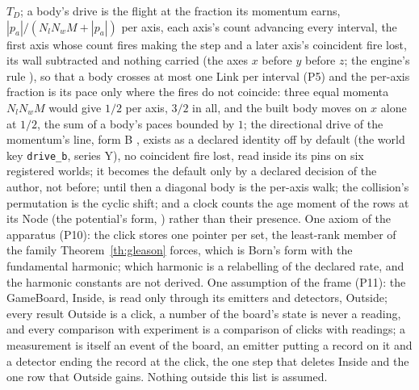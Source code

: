 $T_D$; a body's drive is the flight at the fraction its momentum earns, $|p_a|/(N_l N_w M + |p_a|)$ per axis, each axis's count advancing every interval, the first axis whose count fires making the step and a later axis's coincident fire lost, its wall subtracted and nothing carried (the axes $x$ before $y$ before $z$; the engine's rule \cite{engine}), so that a body crosses at most one Link per interval (P5) and the per-axis fraction is its pace only where the fires do not coincide: three equal momenta $N_l N_w M$ would give $1/2$ per axis, $3/2$ in all, and the built body moves on $x$ alone at $1/2$, the sum of a body's paces bounded by $1$; the directional drive of the momentum's line, form B \cite[record 652]{log}, exists as a declared identity off by default (the world key \texttt{drive\_b}, series Y), no coincident fire lost, read inside its pins on six registered worlds; it becomes the default only by a declared decision of the author, not before; until then a diagonal body is the per-axis walk; the collision's permutation is the cyclic shift; and a clock counts the age moment of the rows at its
Node (the potential's form, \cite[record 394]{log})
rather than their presence. One axiom of the apparatus (P10): the click
stores one pointer per set, the least-rank member of the family
Theorem~\ref{th:gleason} forces, which is Born's form with the
fundamental harmonic; which harmonic is a relabelling of the declared
rate, and the harmonic constants are not derived. One assumption of the frame (P11): the GameBoard, Inside, is read only through its emitters and detectors, Outside; every result Outside is a click, a number of the board's state is never a reading, and every comparison with experiment is a comparison of clicks with readings; a measurement is itself an event of the board, an emitter putting a record on it and a detector ending the record at the click, the one step that deletes Inside and the one row that Outside gains. Nothing outside this list is assumed.

